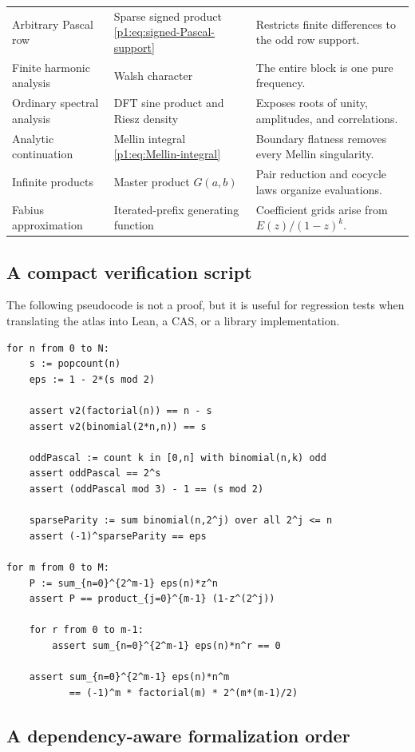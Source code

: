 \documentclass[11pt,oneside]{article}
\numberwithin{equation}{section}
\theoremstyle{definition}
\theoremstyle{remark}
\begin{document}
\begin{longtable}{@{}>{\raggedright\arraybackslash}p{}>{\raggedright\arraybackslash}p{}>{\raggedright\arraybackslash}p{}@{}}
Arbitrary Pascal row & Sparse signed product \eqref{p1:eq:signed-Pascal-support} & Restricts finite differences to the odd row support. \\
Finite harmonic analysis & Walsh character & The entire block is one pure frequency. \\
Ordinary spectral analysis & DFT sine product and Riesz density & Exposes roots of unity, amplitudes, and correlations. \\
Analytic continuation & Mellin integral \eqref{p1:eq:Mellin-integral} & Boundary flatness removes every Mellin singularity. \\
Infinite products & Master product \(G(a,b)\) & Pair reduction and cocycle laws organize evaluations. \\
Fabius approximation & Iterated-prefix generating function & Coefficient grids arise from \(E(z)/(1-z)^k\). \\
\bottomrule
\end{longtable}
\renewcommand{\arraystretch}{1}

\subsection{A compact verification script}

The following pseudocode is not a proof, but it is useful for regression tests
when translating the atlas into Lean, a CAS, or a library implementation.

\begin{lstlisting}[style=pseudo]
for n from 0 to N:
    s := popcount(n)
    eps := 1 - 2*(s mod 2)

    assert v2(factorial(n)) == n - s
    assert v2(binomial(2*n,n)) == s

    oddPascal := count k in [0,n] with binomial(n,k) odd
    assert oddPascal == 2^s
    assert (oddPascal mod 3) - 1 == (s mod 2)

    sparseParity := sum binomial(n,2^j) over all 2^j <= n
    assert (-1)^sparseParity == eps

for m from 0 to M:
    P := sum_{n=0}^{2^m-1} eps(n)*z^n
    assert P == product_{j=0}^{m-1} (1-z^(2^j))

    for r from 0 to m-1:
        assert sum_{n=0}^{2^m-1} eps(n)*n^r == 0

    assert sum_{n=0}^{2^m-1} eps(n)*n^m
           == (-1)^m * factorial(m) * 2^(m*(m-1)/2)
\end{lstlisting}

\subsection{A dependency-aware formalization order}
\label{p1:sec:formalization-order}
\end{document}
